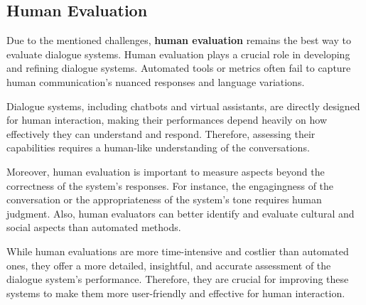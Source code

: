 \subsection{Human Evaluation}
Due to the mentioned challenges, \textbf{human evaluation} remains the best way to evaluate dialogue systems.
Human evaluation plays a crucial role in developing and refining dialogue systems. Automated tools or metrics often fail to capture human communication's nuanced responses and language variations. 

Dialogue systems, including chatbots and virtual assistants, are directly designed for human interaction, making their performances depend heavily on how effectively they can understand and respond.
Therefore, assessing their capabilities requires a human-like understanding of the conversations.

Moreover, human evaluation is important to measure aspects beyond the correctness of the system's responses. For instance, the engagingness of the conversation or the appropriateness of the system's tone requires human judgment. Also, human evaluators can better identify and evaluate cultural and social aspects than automated methods.

While human evaluations are more time-intensive and costlier than automated ones, they offer a more detailed, insightful, and accurate assessment of the dialogue system's performance.
Therefore, they are crucial for improving these systems to make them more user-friendly and effective for human interaction.